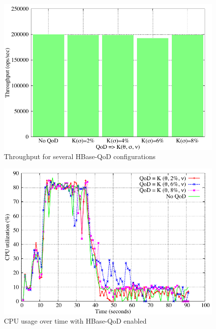 \begin{figure}[b]
\centering
\includegraphics[width=0.8\linewidth]{figs/throughput.pdf}
\caption{Throughput for several HBase-QoD configurations}
\label{fig-throughput}
\end{figure}

\begin{figure}[b]
\centering
\includegraphics[width=0.8\linewidth]{figs/cpu.pdf}
\caption{CPU usage over time with HBase-QoD enabled}
\label{fig-cpu}
\end{figure}


